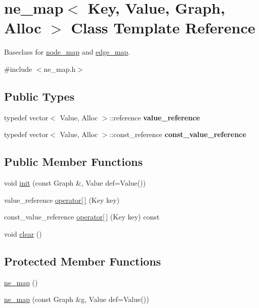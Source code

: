 \hypertarget{classne__map}{}\section{ne\+\_\+map$<$ Key, Value, Graph, Alloc $>$ Class Template Reference}
\label{classne__map}


Baseclass for \mbox{\hyperlink{classnode__map}{node\+\_\+map}} and \mbox{\hyperlink{classedge__map}{edge\+\_\+map}}.  




{\ttfamily \#include $<$ne\+\_\+map.\+h$>$}

\subsection*{Public Types}
\begin{DoxyCompactItemize}
\item 
\mbox{\label{classne__map_afd021ff2dd14cd255ec0635af1acde8a}} 
typedef vector$<$ Value, Alloc $>$\+::reference {\bfseries value\+\_\+reference}
\item 
\mbox{\label{classne__map_aab434040b52c0b0477cdfa4639869523}} 
typedef vector$<$ Value, Alloc $>$\+::const\+\_\+reference {\bfseries const\+\_\+value\+\_\+reference}
\end{DoxyCompactItemize}
\subsection*{Public Member Functions}
\begin{DoxyCompactItemize}
\item 
void \mbox{\hyperlink{classne__map_a4ef2ab4aebcb57a7a101975bf6a88e24}{init}} (const Graph \&, Value def=Value())
\item 
value\+\_\+reference \mbox{\hyperlink{classne__map_a4bcfa7ec2dcbfaa42fab93dfa81e8ab0}{operator\mbox{[}$\,$\mbox{]}}} (Key key)
\item 
const\+\_\+value\+\_\+reference \mbox{\hyperlink{classne__map_ad8d23cc924963ddff8267e625dcbffc6}{operator\mbox{[}$\,$\mbox{]}}} (Key key) const
\item 
void \mbox{\hyperlink{classne__map_aebe555c23769c6dcc869b5ac7fae6a9c}{clear}} ()
\end{DoxyCompactItemize}
\subsection*{Protected Member Functions}
\begin{DoxyCompactItemize}
\item 
\mbox{\hyperlink{classne__map_acbe94c2209408e8af27fb9580251f360}{ne\+\_\+map}} ()
\item 
\mbox{\hyperlink{classne__map_a769ee373d4cd8d3ef2c1577372da149c}{ne\+\_\+map}} (const Graph \&g, Value def=Value())
\end{DoxyCompactItemize}



